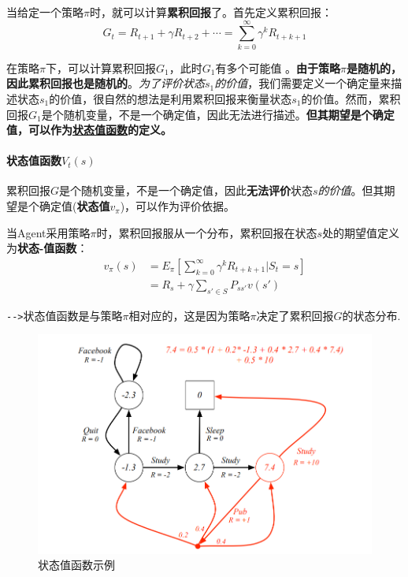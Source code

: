 \documentclass[UTF8,a4paper,12pt]{ctexbook}
\begin{document}
				当给定一个策略$\pi$时，就可以计算\textbf{累积回报}了。首先定义累积回报：
				\begin{equation}
					G_t = R_{t+1} + \gamma R_{t+2} + \cdots = \sum_{k=0}^\infty \gamma^k R_{t+k+1}
				\end{equation}
				
				在策略$\pi$下，可以计算累积回报$G_1$，此时$G_1$有多个可能值 。\textbf{由于策略}$\pi$\textbf{是随机的，因此累积回报也是随机的}。\textit{为了评价状态}$s_1$\textit{的价值}，我们需要定义一个确定量来描述状态$s_1$的价值，很自然的想法是利用累积回报来衡量状态$s_1$的价值。然而，累积回报$G_1$是个随机变量，不是一个确定值，因此无法进行描述。\textbf{但其期望是个确定值，可以作为\underline{状态值函数}的定义。}
				
			
			\paragraph{状态值函数$V_t(s)$}
				累积回报$G$是个随机变量，不是一个确定值，因此\textbf{无法评价}状态$s$\textit{的价值}。但其期望是个确定值(\textbf{状态值}$v_\pi$)，可以作为评价依据。
			
				当Agent采用策略$\pi$时，累积回报服从一个分布，累积回报在状态$s$处的期望值定义为\textbf{状态-值函数}：
				\begin{equation}
					\begin{aligned}
						v_\pi(s) &= E_\pi \left[\sum_{k=0}^{\infty}\gamma^k R_{t+k+1}|S_t = s \right]	\\
							&= R_s + \gamma \sum_{s' \in S}P_{ss'}v(s')
					\end{aligned}
				\end{equation}
				
				\verb|-->|状态值函数是与策略$\pi$相对应的，这是因为策略$\pi$决定了累积回报$G$的状态分布.
				
				\begin{figure}[H] 
					\centering
					\includegraphics[width=.6\linewidth]{MDP-example3}
					\caption{状态值函数示例}
				\end{figure}		
								
\end{document}

